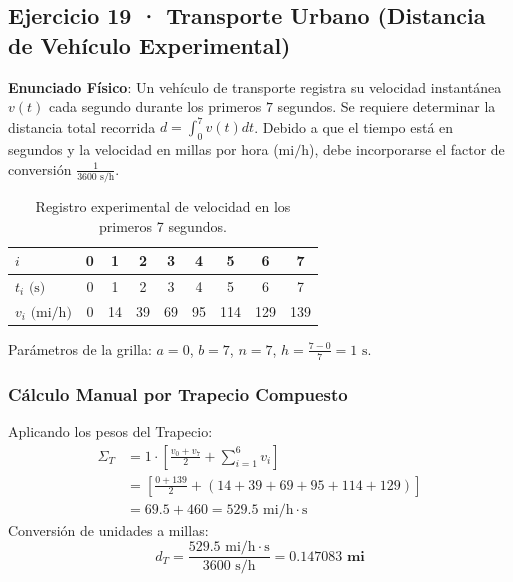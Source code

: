 \documentclass[11pt,a4paper]{article}
\begin{document}
\subsection{Ejercicio 19 · Transporte Urbano (Distancia de Vehículo Experimental)}

\textbf{Enunciado Físico}: Un vehículo de transporte registra su velocidad instantánea $v(t)$ cada segundo durante los primeros $7$ segundos. Se requiere determinar la distancia total recorrida $d = \int_0^7 v(t) dt$. Debido a que el tiempo está en segundos y la velocidad en millas por hora ($\text{mi/h}$), debe incorporarse el factor de conversión $\frac{1}{3600 \text{ s/h}}$.

\begin{table}[h!]
\centering
\caption{Registro experimental de velocidad en los primeros 7 segundos.}
\begin{tabular}{lcccccccc}
\toprule
$i$ & 0 & 1 & 2 & 3 & 4 & 5 & 6 & 7 \\
\midrule
$t_i \text{ (s)}$ & 0 & 1 & 2 & 3 & 4 & 5 & 6 & 7 \\
$v_i \text{ (mi/h)}$ & 0 & 14 & 39 & 69 & 95 & 114 & 129 & 139 \\
\bottomrule
\end{tabular}
\end{table}

Parámetros de la grilla: $a = 0$, $b = 7$, $n = 7$, $h = \frac{7 - 0}{7} = 1\text{ s}$.

\subsubsection{Cálculo Manual por Trapecio Compuesto}
Aplicando los pesos del Trapecio:
\begin{align*}
\Sigma_T &= 1 \cdot \left[ \frac{v_0 + v_7}{2} + \sum_{i=1}^{6} v_i \right] \\
         &= \left[ \frac{0 + 139}{2} + (14 + 39 + 69 + 95 + 114 + 129) \right] \\
         &= 69.5 + 460 = 529.5 \text{ mi/h} \cdot \text{s}
\end{align*}
Conversión de unidades a millas:
\begin{equation}
d_T = \frac{529.5 \text{ mi/h} \cdot \text{s}}{3600 \text{ s/h}} = \mathbf{0.147083 \text{ mi}}
\end{equation}
\end{document}
